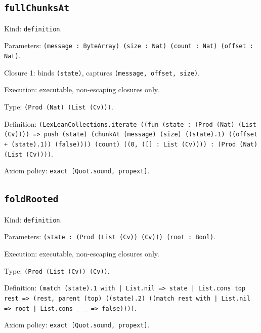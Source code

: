 \documentclass[11pt]{article}
\begin{document}
\subsection*{\texttt{fullChunksAt}}
\noindent Kind: \texttt{definition}.\par
\noindent Parameters: \texttt{(message : ByteArray) (size : Nat) (count : Nat) (offset : Nat)}.\par
\noindent Closure 1: binds \texttt{(state)}, captures \texttt{(message, offset, size)}.\par
\noindent Execution: executable, non-escaping closures only.\par
\noindent Type: \texttt{(Prod (Nat) (List (Cv)))}.\par
\noindent Definition: \texttt{(LexLeanCollections.iterate ((fun (state : (Prod (Nat) (List (Cv)))) => push (state) (chunkAt (message) (size) ((state).1) ((offset + (state).1)) (false)))) (count) ((0, ([] : List (Cv)))) : (Prod (Nat) (List (Cv))))}.\par
\noindent Axiom policy: \texttt{exact [Quot.sound, propext]}.\par
\subsection*{\texttt{foldRooted}}
\noindent Kind: \texttt{definition}.\par
\noindent Parameters: \texttt{(state : (Prod (List (Cv)) (Cv))) (root : Bool)}.\par
\noindent Execution: executable, non-escaping closures only.\par
\noindent Type: \texttt{(Prod (List (Cv)) (Cv))}.\par
\noindent Definition: \texttt{(match (state).1 with | List.nil => state | List.cons top rest => (rest, parent (top) ((state).2) ((match rest with | List.nil => root | List.cons \_ \_ => false))))}.\par
\noindent Axiom policy: \texttt{exact [Quot.sound, propext]}.\par
\end{document}
